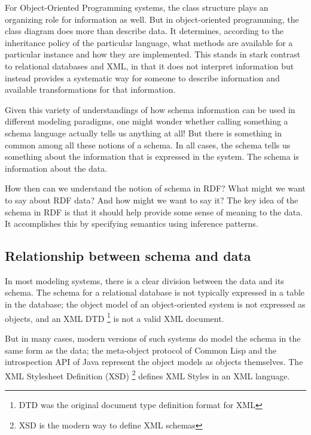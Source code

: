 For Object-Oriented Programming systems, the class structure plays an
organizing role for information as well. But in object-oriented
programming, the class diagram does more than describe data. It
determines, according to the inheritance policy of the particular
language, what methods are available for a particular instance and how
they are implemented. This stands in stark contrast to relational
databases and XML, in that it does not interpret information but instead
provides a systematic way for someone to describe information and
available transformations for that information.

Given this variety of understandings of how schema information can be
used in different modeling paradigms, one might wonder whether calling
something a schema language actually tells us anything at all! But there
is something in common among all these notions of a schema. In all
cases, the schema tells us something about the information that is
expressed in the system. The schema is information about the data.

How then can we understand the notion of schema in RDF? What might we
want to say about RDF data? And how might we want to say it? The key
idea of the schema in RDF is that it should help provide some sense of
meaning to the data. It accomplishes this by specifying semantics using
inference patterns.

\subsection{Relationship between schema and data}

In most modeling systems, there is a clear division between the data and
its schema. The schema for a relational database is not typically
expressed in a table in the database; the object model of an
object-oriented system is not expressed as objects, and an XML DTD \footnote{DTD was the original 
document type definition format for XML} is
not a valid XML document.

But in many cases, modern versions of such systems do model the schema
in the same form as the data; the meta-object protocol of Common Lisp
and the introspection API of Java represent the object models as objects
themselves. The XML Stylesheet Definition (XSD) \footnote {XSD is the modern way to define XML schemas} 
defines XML Styles in an XML
language.

